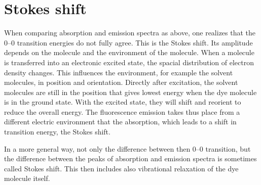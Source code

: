 \section{Stokes shift}

When comparing absorption and emission spectra as above, one realizes that the  0--0 transition  energies do not fully agree. This is the Stokes shift. Its amplitude depends on the molecule and the environment of the molecule. When a molecule is transferred into an electronic excited state, the spacial distribution of electron density changes. This influences the environment, for example the solvent molecules, in position and orientation. Directly after excitation, the solvent molecules are still in the position that gives lowest energy when the dye molecule is in the ground state. With the excited state, they will shift and reorient to reduce the overall energy. The fluorescence emission takes thus place from a different electric environment that the absorption, which leads to a shift in transition energy, the Stokes shift.

In a more general way, not only the difference between then 0--0 transition, but the difference between the peaks of absorption and emission spectra is sometimes called Stokes shift. This then includes also vibrational relaxation of the dye molecule itself.





\printbibliography[segment=\therefsegment,heading=subbibliography]
